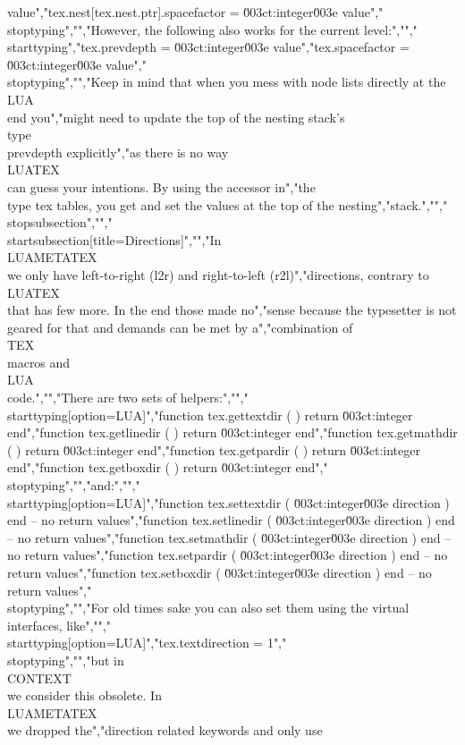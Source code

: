 value","tex.nest[tex.nest.ptr].spacefactor = \u003ct:integer\u003e value","\\stoptyping","","However, the following also works for the current level:","","\\starttyping","tex.prevdepth   = \u003ct:integer\u003e value","tex.spacefactor = \u003ct:integer\u003e value","\\stoptyping","","Keep in mind that when you mess with node lists directly at the \\LUA\\ end you","might need to update the top of the nesting stack's \\type {\\prevdepth} explicitly","as there is no way \\LUATEX\\ can guess your intentions. By using the accessor in","the \\type {tex} tables, you get and set the values at the top of the nesting","stack.","","\\stopsubsection","","\\startsubsection[title={Directions}]","","In \\LUAMETATEX\\ we only have left-to-right (l2r) and right-to-left (r2l)","directions, contrary to \\LUATEX\\ that has few more. In the end those made no","sense because the typesetter is not geared for that and demands can be met by a","combination of \\TEX\\ macros and \\LUA\\ code.","","There are two sets of helpers:","","\\starttyping[option=LUA]","function tex.gettextdir ( ) return \u003ct:integer end","function tex.getlinedir ( ) return \u003ct:integer end","function tex.getmathdir ( ) return \u003ct:integer end","function tex.getpardir  ( ) return \u003ct:integer end","function tex.getboxdir  ( ) return \u003ct:integer end","\\stoptyping","","and:","","\\starttyping[option=LUA]","function tex.settextdir ( \u003ct:integer\u003e direction ) end -- no return values","function tex.setlinedir ( \u003ct:integer\u003e direction ) end -- no return values","function tex.setmathdir ( \u003ct:integer\u003e direction ) end -- no return values","function tex.setpardir  ( \u003ct:integer\u003e direction ) end -- no return values","function tex.setboxdir  ( \u003ct:integer\u003e direction ) end -- no return values","\\stoptyping","","For old times sake you can also set them using the virtual interfaces, like","","\\starttyping[option=LUA]","tex.textdirection = 1","\\stoptyping","","but in \\CONTEXT\\ we consider this obsolete. In \\LUAMETATEX\\ we dropped the","direction related keywords and only use 